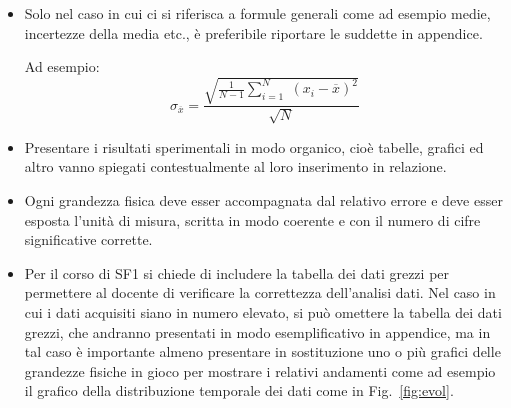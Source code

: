 \documentclass[a4paper, 11pt]{article}
\begin{document}
{\begin{itemize}
			
			\item Solo nel caso in cui ci si riferisca a formule generali come ad esempio medie, incertezze della media etc., \`e preferibile riportare le suddette in appendice. 
			
			
			Ad esempio: 
			\bigskip
			\begin{equation}\label{eq:stderr}
				\sigma_{\overline{x}}=\frac{\sqrt{\frac{1}{N-1}\sum_{i=1}^N\;(x_i-\overline{x})^2}}{\sqrt{N}}
			\end{equation}
			\bigskip
			
			\item Presentare i risultati sperimentali  in modo organico, cio\`e tabelle, grafici ed altro vanno spiegati contestualmente al loro inserimento in relazione.
			
			\item Ogni grandezza fisica deve esser accompagnata dal relativo errore e deve esser esposta l'unit\`a di misura, scritta in modo coerente e con il numero di cifre significative corrette.
			\item Per il corso di SF1 si chiede di includere la tabella dei dati grezzi per permettere al docente di verificare la correttezza dell'analisi dati. Nel caso in cui i dati acquisiti siano in numero elevato, si pu\`o omettere la tabella dei dati grezzi, che andranno presentati in modo esemplificativo in appendice, ma in tal caso \`e importante almeno presentare in sostituzione uno o pi\`u grafici delle grandezze fisiche in gioco per mostrare i relativi andamenti come ad esempio il grafico della distribuzione temporale dei dati come in Fig.~\ref{fig:evol}.
			

\end{itemize}}
\end{document}
